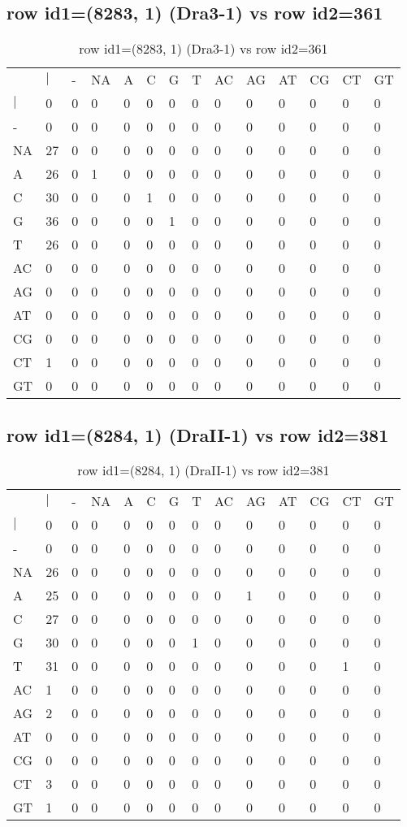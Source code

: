 \subsection{row id1=(8283, 1) (Dra3-1) vs row id2=361}
\begin{center}
\begin{longtable}{|l|l|l|l|l|l|l|l|l|l|l|l|l|l|}
\caption{row id1=(8283, 1) (Dra3-1) vs row id2=361} \label{table_dm446}\\
\hline
\\
\hline
&$|$&-&NA&A&C&G&T&AC&AG&AT&CG&CT&GT\\
$|$&0&0&0&0&0&0&0&0&0&0&0&0&0\\
-&0&0&0&0&0&0&0&0&0&0&0&0&0\\
NA&27&0&0&0&0&0&0&0&0&0&0&0&0\\
A&26&0&1&0&0&0&0&0&0&0&0&0&0\\
C&30&0&0&0&1&0&0&0&0&0&0&0&0\\
G&36&0&0&0&0&1&0&0&0&0&0&0&0\\
T&26&0&0&0&0&0&0&0&0&0&0&0&0\\
AC&0&0&0&0&0&0&0&0&0&0&0&0&0\\
AG&0&0&0&0&0&0&0&0&0&0&0&0&0\\
AT&0&0&0&0&0&0&0&0&0&0&0&0&0\\
CG&0&0&0&0&0&0&0&0&0&0&0&0&0\\
CT&1&0&0&0&0&0&0&0&0&0&0&0&0\\
GT&0&0&0&0&0&0&0&0&0&0&0&0&0\\
\hline
\end{longtable}
\end{center}

\subsection{row id1=(8284, 1) (DraII-1) vs row id2=381}
\begin{center}
\begin{longtable}{|l|l|l|l|l|l|l|l|l|l|l|l|l|l|}
\caption{row id1=(8284, 1) (DraII-1) vs row id2=381} \label{table_dm448}\\
\hline
\\
\hline
&$|$&-&NA&A&C&G&T&AC&AG&AT&CG&CT&GT\\
$|$&0&0&0&0&0&0&0&0&0&0&0&0&0\\
-&0&0&0&0&0&0&0&0&0&0&0&0&0\\
NA&26&0&0&0&0&0&0&0&0&0&0&0&0\\
A&25&0&0&0&0&0&0&0&1&0&0&0&0\\
C&27&0&0&0&0&0&0&0&0&0&0&0&0\\
G&30&0&0&0&0&0&1&0&0&0&0&0&0\\
T&31&0&0&0&0&0&0&0&0&0&0&1&0\\
AC&1&0&0&0&0&0&0&0&0&0&0&0&0\\
AG&2&0&0&0&0&0&0&0&0&0&0&0&0\\
AT&0&0&0&0&0&0&0&0&0&0&0&0&0\\
CG&0&0&0&0&0&0&0&0&0&0&0&0&0\\
CT&3&0&0&0&0&0&0&0&0&0&0&0&0\\
GT&1&0&0&0&0&0&0&0&0&0&0&0&0\\
\hline
\end{longtable}
\end{center}

